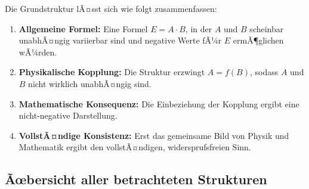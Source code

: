 ﻿\documentclass[12pt, a4paper]{article}
\begin{document}
	Die Grundstruktur lÃ¤sst sich wie folgt zusammenfassen:
	\begin{enumerate}
		\item \textbf{Allgemeine Formel:} Eine Formel $E = A \cdot B$, in der $A$ und $B$ scheinbar unabhÃ¤ngig variierbar sind und negative Werte fÃ¼r $E$ ermÃ¶glichen wÃ¼rden.
		\item \textbf{Physikalische Kopplung:} Die Struktur erzwingt $A = f(B)$, sodass $A$ und $B$ nicht wirklich unabhÃ¤ngig sind.
		\item \textbf{Mathematische Konsequenz:} Die Einbeziehung der Kopplung ergibt eine nicht-negative Darstellung.
		\item \textbf{VollstÃ¤ndige Konsistenz:} Erst das gemeinsame Bild von Physik und Mathematik ergibt den vollstÃ¤ndigen, widersprufsfreien Sinn.
	\end{enumerate}
	
	\subsection{Ãœbersicht aller betrachteten Strukturen}
	
\end{document}
